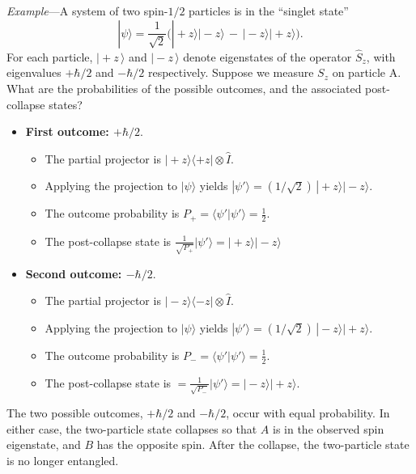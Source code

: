 \documentclass[pra,12pt]{revtex4}
\begin{document}
\begin{framed}
\noindent
\textit{Example}---A system of two spin-$1/2$ particles is in
the ``singlet state''
\begin{equation}
  |\psi\rangle = \frac{1}{\sqrt{2}} \Big(|\!+\!z\rangle|\!-\!z\rangle \,-\, |\!-\!z\rangle|\!+\!z\rangle\Big).
\end{equation}
For each particle, $|\!+\!z\,\rangle$ and $|\!-\!z\,\rangle$ denote
eigenstates of the operator $\hat{S}_z$, with eigenvalues $+\hbar/2$
and $-\hbar/2$ respectively.  Suppose we measure $S_z$ on particle A.
What are the probabilities of the possible outcomes, and the
associated post-collapse states?

\begin{itemize}
\item \textbf{First outcome: $+\hbar/2$}.
  \begin{itemize}
  \item The partial projector is $|\!+\!z\rangle\langle+z| \otimes \hat{I}$.
  \item Applying the projection to $|\psi\rangle$ yields
    $|\psi'\rangle = (1/\sqrt{2})\,|\!+\!z\rangle|\!-\!z\rangle$.
  \item The outcome probability is $\displaystyle
    P_+ = \langle \psi'|\psi'\rangle = \frac{1}{2}$.
  \item The post-collapse state is $\displaystyle
    \frac{1}{\sqrt{P_+}} |\psi'\rangle = |\!+\!z\rangle |\!-\!z\rangle$
  \end{itemize}

\item \textbf{Second outcome: $-\hbar/2$}.
  \begin{itemize}
  \item The partial projector is $|\!-\!z\rangle\langle-z| \otimes
    \hat{I}$.
  \item Applying the projection to $|\psi\rangle$ yields
    $|\psi'\rangle = (1/\sqrt{2})\,|\!-\!z\rangle|\!+\!z\rangle$.
  \item The outcome probability is $\displaystyle P_- = \langle \psi'|\psi'\rangle =
    \frac{1}{2}$.
  \item The post-collapse state is $\displaystyle = \frac{1}{\sqrt{P_-}} |\psi'\rangle
    = |\!-\!z\rangle |\!+\!z\rangle$.
  \end{itemize}
\end{itemize}
The two possible outcomes, $+\hbar/2$ and $-\hbar/2$, occur with equal
probability.  In either case, the two-particle state collapses so that
$A$ is in the observed spin eigenstate, and $B$ has the opposite spin.
After the collapse, the two-particle state is no longer entangled.
\end{framed}
\end{document}
